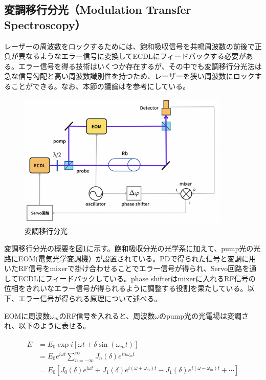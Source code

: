\documentclass[dvipdfmx]{jsreport}
\begin{document}
\subsection{変調移行分光（Modulation Transfer Spectroscopy）}
レーザーの周波数をロックするためには、飽和吸収信号を共鳴周波数の前後で正負が異なるようなエラー信号に変換してECDLにフィードバックする必要がある。エラー信号を得る技術はいくつか存在するが、その中でも変調移行分光法は急な信号勾配と高い周波数識別性を持つため、レーザーを狭い周波数にロックすることができる。なお、本節の議論は\cite{mt}\cite{mt2}を参考にしている。

\begin{figure}
\centering
\includegraphics[width=0.9\textwidth]{images/mt.png}
\caption{\label{fig:mt}変調移行分光}
\end{figure}

変調移行分光の概要を図\ref{fig:mt}に示す。飽和吸収分光の光学系に加えて、pump光の光路にEOM(電気光学変調機）が設置されている。PDで得られた信号と変調に用いたRF信号をmixerで掛け合わせることでエラー信号が得られ、Servo回路を通してECDLにフィードバックしている。phase shifterはmixerに入れるRF信号の位相をきれいなエラー信号が得られるように調整する役割を果たしている。以下、エラー信号が得られる原理について述べる。

EOMに周波数$\omega_m$のRF信号を入れると、周波数$\omega$のpump光の光電場は変調され、以下のように表せる。

\begin{align}
\begin{split}
    E &= 
        E_0 \exp i \left[{\omega t + \delta \sin{(\omega_m t)}} \right] \\
    &= E_0e^{i\omega t} \sum_{n = -\infty}^\infty J_n(\delta) e^{in\omega_m t} \\
    &= E_0 \left[ J_0(\delta)e^{i\omega t} + J_1(\delta)e^{i(\omega + \omega_m)t} - J_1(\delta)e^{i(\omega - \omega_m)t} + \cdots \right]
\end{split}
\end{align}
\end{document}
